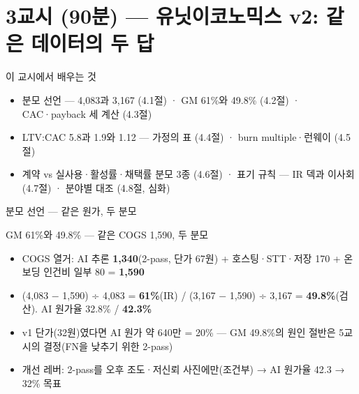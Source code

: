 \section{3교시 (90분) — 유닛이코노믹스 v2: 같은 데이터의 두 답}
\begin{frame}{이 교시에서 배우는 것}
\begin{itemize}
\item 분모 선언 — 4,083과 3,167 (4.1절) · GM 61\%와 49.8\% (4.2절) · CAC·payback 세 계산 (4.3절)
\item LTV:CAC 5.8과 1.9와 1.12 — 가정의 표 (4.4절) · burn multiple·런웨이 (4.5절)
\item 계약 vs 실사용·활성률·채택률 분모 3종 (4.6절) · 표기 규칙 — IR 덱과 이사회 (4.7절) · 분야별 대조 (4.8절, 심화)
\end{itemize}
\end{frame}

\begin{frame}{분모 선언 — 같은 원가, 두 분모}
\end{frame}

\begin{frame}{GM 61\%와 49.8\% — 같은 COGS 1,590, 두 분모}
\begin{itemize}
\item COGS 열거: AI 추론 \textbf{1,340}(2-pass, 단가 67원) + 호스팅·STT·저장 170 + 온보딩 인건비 일부 80 = \textbf{1,590}
\item (4,083 $-$ 1,590) ÷ 4,083 = \textbf{61\%}(IR) / (3,167 $-$ 1,590) ÷ 3,167 = \textbf{49.8\%}(검산). AI 원가율 32.8\% / \textbf{42.3\%}
\item v1 단가(32원)였다면 AI 원가 약 640만 = 20\% — GM 49.8\%의 원인 절반은 5교시의 결정(FN을 낮추기 위한 2-pass)
\item 개선 레버: 2-pass를 오후 조도·저신뢰 사진에만(조건부) → AI 원가율 42.3 → 32\% 목표
\end{itemize}
\end{frame}

